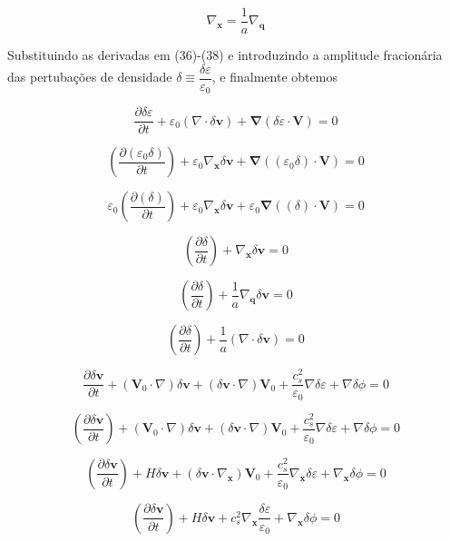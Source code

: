 \documentclass[a4paper,12pt]{article}
\begin{document}
\begin{equation}
	\nabla_\mathbf{x} = \dfrac{1}{a}\nabla_\mathbf{q}
\end{equation}

Substituindo as derivadas em (36)-(38) e introduzindo a amplitude fracionária das pertubações de densidade $\delta\equiv\dfrac{\delta\varepsilon}{\varepsilon_0}$, e finalmente obtemos

$$\dfrac{\partial\delta\varepsilon}{\partial t} + \varepsilon_0(\nabla\cdot\delta\mathbf{v})+\mathbf{\nabla} (\delta\varepsilon \cdot \mathbf{V}) = 0$$

$$\left(\dfrac{\partial(\varepsilon_0\delta)}{\partial t}\right) + \varepsilon_0\nabla_\mathbf{x}\delta\mathbf{v}+\mathbf{\nabla} ((\varepsilon_0\delta) \cdot \mathbf{V}) = 0$$

$$\varepsilon_0\left(\dfrac{\partial(\delta)}{\partial t}\right) + \varepsilon_0\nabla_\mathbf{x}\delta\mathbf{v}+\varepsilon_0\mathbf{\nabla} ((\delta) \cdot \mathbf{V}) = 0$$

$$\left(\dfrac{\partial\delta}{\partial t}\right) + \nabla_\mathbf{x}\delta\mathbf{v} = 0$$

$$\left(\dfrac{\partial\delta}{\partial t}\right) + \dfrac{1}{a}\nabla_\mathbf{q}\delta\mathbf{v} = 0$$

\begin{equation}
	\left( \dfrac{\partial \delta}{\partial t} \right) + \dfrac{1}{a}(\nabla\cdot\delta\mathbf{v}) = 0
\end{equation}
\newline


$$\dfrac{\partial\delta\mathbf{v}}{\partial t} + (\mathbf{V}_0 \cdot \nabla)\delta\mathbf{v} + (\delta\mathbf{v} \cdot \nabla) \mathbf{V}_0 + \dfrac{c^2_s}{\varepsilon_0}\nabla\delta\varepsilon + \nabla\delta\phi = 0$$

$$\left( \dfrac{\partial\delta\mathbf{v}}{\partial t} \right) + (\mathbf{V}_0 \cdot \nabla)\delta\mathbf{v} + (\delta\mathbf{v} \cdot \nabla) \mathbf{V}_0 + \dfrac{c^2_s}{\varepsilon_0}\nabla\delta\varepsilon + \nabla\delta\phi = 0$$

$$\left( \dfrac{\partial\delta\mathbf{v}}{\partial t} \right) +H\delta\mathbf{v} + (\delta\mathbf{v} \cdot \nabla_\mathbf{x}) \mathbf{V}_0 + \dfrac{c^2_s}{\varepsilon_0}\nabla_\mathbf{x}\delta\varepsilon + \nabla_\mathbf{x}\delta\phi = 0$$

$$\left( \dfrac{\partial\delta\mathbf{v}}{\partial t} \right) +H\delta\mathbf{v} + c^2_s\nabla_\mathbf{x}\dfrac{\delta\varepsilon}{\varepsilon_0} + \nabla_\mathbf{x}\delta\phi = 0$$
\end{document}
